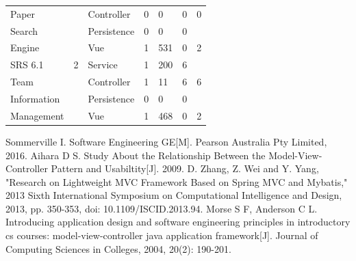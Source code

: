\documentclass[conference]{IEEEtran}
\begin{document}
\begin{table}[!htb]
\begin{tabular}{p{2cm}p{1.5cm}p{2cm}p{3cm}p{1.5cm}p{3cm}l}
		Paper       &              & Controller                  & 0                & 0   & 0                & 0               \\
		Search      &              & Persistence                 & 0                & 0   & 0                &                 \\
		Engine      &              & Vue                         & 1                & 531 & 0                & 2               \\
		\hline
		SRS 6.1     & 2            & Service                     & 1                & 200 & 6                &                 \\
		Team        &              & Controller                  & 1                & 11  & 6                & 6               \\
		Information &              & Persistence                 & 0                & 0   & 0                &                 \\
		Management  &              & Vue                         & 1                & 468 & 0                & 2               \\
		\hline
	\end{tabular}
	\label{tb:cc}
\end{table}


\begin{thebibliography}{00}
	 Sommerville I. Software Engineering GE[M]. Pearson Australia Pty Limited, 2016.
	 Aihara D S. Study About the Relationship Between the Model-View-Controller Pattern and Usabiltity[J]. 2009.
	 D. Zhang, Z. Wei and Y. Yang, "Research on Lightweight MVC Framework Based on Spring MVC and Mybatis," 2013 Sixth International Symposium on Computational Intelligence and Design, 2013, pp. 350-353, doi: 10.1109/ISCID.2013.94.
	 Morse S F, Anderson C L. Introducing application design and software engineering principles in introductory cs courses: model-view-controller java application framework[J]. Journal of Computing Sciences in Colleges, 2004, 20(2): 190-201.

\end{thebibliography}
\end{document}
